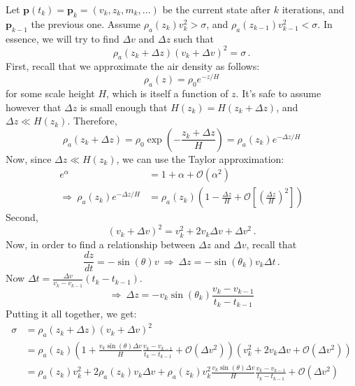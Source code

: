 Let $\pmb{p}(t_k) = \pmb{p}_k = (v_k, z_k, m_k, \dots)$ be the current state after $k$ iterations, and $\pmb{p}_{k-1}$ the previous one. Assume $\rho_a(z_k)v_k^2 > \sigma$, and $\rho_a(z_{k-1})v_{k-1}^2 < \sigma$. In essence, we will try to find $\Delta v$ and $\Delta z$ such that
\begin{equation*}
    \rho_a(z_k + \Delta z)\left(v_k + \Delta v\right)^2 = \sigma\,.
\end{equation*}
First, recall that we approximate the air density as follows:
\begin{equation*}
    \rho_a(z) = \rho_0 e^{-z/H}
\end{equation*}
for some scale height $H$, which is itself a function of $z$. It's safe to assume however that $\Delta z$ is small enough that $H(z_k) = H(z_k + \Delta z)$, and $\Delta z \ll H(z_k)$. Therefore,
\begin{equation*}
    \rho_a(z_k + \Delta z) = \rho_0 \exp\left(-\frac{z_k+\Delta z}{H}\right) = \rho_a(z_k)e^{-\Delta z / H}
\end{equation*}
Now, since $\Delta z \ll H(z_k)$, we can use the Taylor approximation:
\begin{align*}
    e^\alpha &= 1 + \alpha + \mathcal{O}(\alpha^2) \\
    \Rightarrow\ \rho_a(z_k)e^{-\Delta z / H} &= \rho_a(z_k)\left(1 - \frac{\Delta z}{H} + \mathcal{O}\left[\left(\frac{\Delta z}{H}\right)^2\right]\right)
\end{align*}
Second,
\begin{equation*}
    (v_k + \Delta v)^2 = v_k^2 + 2v_k\Delta v + \Delta v^2\,.
\end{equation*}
Now, in order to find a relationship between $\Delta z$ and $\Delta v$, recall that
\begin{equation*}
     \frac{dz}{dt} = -\sin(\theta) v\ \Rightarrow\ \Delta z = -\sin(\theta_k) v_k\Delta t\,.
\end{equation*}
Now $\Delta t= \frac{\Delta v}{v_k - v_{k-1}}(t_k - t_{k-1})$.
\begin{equation*}
    \Rightarrow\ \Delta z = -v_k\sin(\theta_k)\frac{v_k - v_{k-1}}{t_k - t_{k-1}}
\end{equation*}
Putting it all together, we get:
\begin{align*}
    \sigma &= \rho_a(z_k + \Delta z)\left(v_k + \Delta v\right)^2 \\
    &= \rho_a(z_k)\left(1 + \frac{v_k\sin(\theta)\Delta v}{H}\frac{v_k - v_{k-1}}{t_k - t_{k-1}} + \mathcal{O}(\Delta v^2)\right)(v_k^2 + 2v_k\Delta v + \mathcal{O}(\Delta v^2)) \\
    &= \rho_a(z_k)v_k^2 + 2\rho_a(z_k)v_k\Delta v + \rho_a(z_k)v_k^2 \frac{v_k\sin(\theta)\Delta v}{H}\frac{v_k - v_{k-1}}{t_k - t_{k-1}} + \mathcal{O}(\Delta v^2)
\end{align*}
